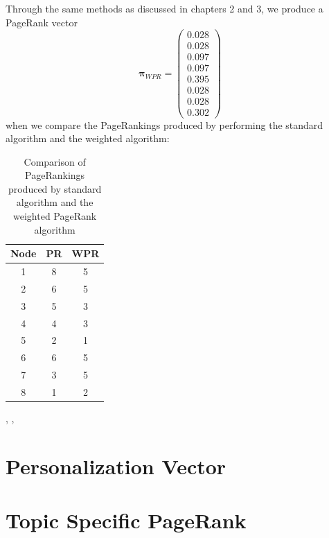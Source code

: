 \documentclass[11pt]{report}
\begin{document}
Through the same methods as discussed in chapters 2 and 3, we produce a PageRank vector \[\boldsymbol\pi_{WPR} = \left(
\begin{array}{c}
0.028 \\
0.028 \\
0.097 \\
0.097 \\
0.395 \\
0.028 \\
0.028 \\
0.302
\end{array}
\right)\]
when we compare the PageRankings produced by performing the standard algorithm and the weighted algorithm:
\begin{table}[H] \caption{Comparison of PageRankings produced by standard algorithm and the weighted PageRank algorithm}
 \centering
 \begin{tabular} {c| c c} 
 Node & PR & WPR \\ [0.5ex] 
 \hline
 1&8&5\\
 2&6&5\\
 3&5&3\\
 4&4&3\\
 5&2&1\\
 6&6&5\\
 7&3&5\\
 8&1&2\\
 \end{tabular}
 \label{comparison}
\end{table}
\cite{langville}, \cite{xing2004weighted}, \cite{baeza2004web}


\section{Personalization Vector}

\section{Topic Specific PageRank}
\end{document}
